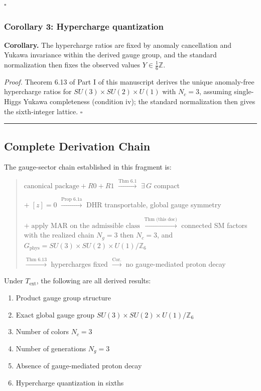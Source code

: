 \(\square\)

\subsubsection{Corollary 3: Hypercharge quantization}\label{corollary-3-hypercharge-quantization}

\textbf{Corollary.} The hypercharge ratios are fixed by anomaly cancellation and Yukawa invariance within the derived gauge group, and the standard normalization then fixes the observed values \(Y \in \frac{1}{6}\mathbb{Z}\).

\emph{Proof.} Theorem 6.13 of Part I of this manuscript derives the unique anomaly-free hypercharge ratios for \(SU(3) \times SU(2) \times U(1)\) with \(N_c = 3\), assuming single-Higgs Yukawa completeness (condition iv); the standard normalization then gives the sixth-integer lattice. \(\square\)

\begin{center}\rule{0.5\linewidth}{0.5pt}\end{center}

\subsection{Complete Derivation Chain}\label{9-complete-derivation-chain}

The gauge-sector chain established in this fragment is:

\begin{quote}
\(\text{canonical package} + R0 + R1\) \(\xrightarrow{\text{Thm 6.1}}\) \(\exists\, G\) compact

\(+ \; [z]=0\) \(\xrightarrow{\text{Prop 6.1a}}\) DHR transportable, global gauge symmetry

\(+ \;\text{apply MAR on the admissible class}\) \(\xrightarrow{\text{Thm (this doc)}}\) connected SM factors with the realized chain \(N_g = 3\) then \(N_c = 3\), and \(G_{\mathrm{phys}} = SU(3) \times SU(2) \times U(1)/\mathbb{Z}_6\)

\(\xrightarrow{\text{Thm 6.13}}\) hypercharges fixed \(\xrightarrow{\text{Cor.}}\) no gauge-mediated proton decay
\end{quote}

Under \(T_{\mathrm{ext}}\), the following are all derived results:

\begin{enumerate}
\def\labelenumi{\arabic{enumi}.}
\tightlist
\item
  Product gauge group structure
\item
  Exact global gauge group \(SU(3) \times SU(2) \times U(1)/\mathbb{Z}_6\)
\item
  Number of colors \(N_c = 3\)
\item
  Number of generations \(N_g = 3\)
\item
  Absence of gauge-mediated proton decay
\item
  Hypercharge quantization in sixths
\end{enumerate}

